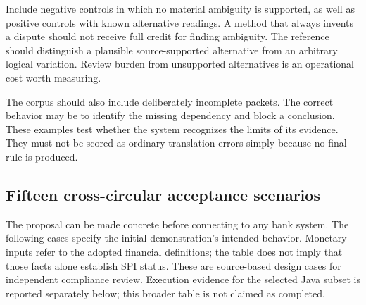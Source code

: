 \documentclass[12pt,a4paper,oneside,openany]{book}
\begin{document}
Include negative controls in which no material ambiguity is supported, as well
as positive controls with known alternative readings. A method that always
invents a dispute should not receive full credit for finding ambiguity. The
reference should distinguish a plausible source-supported alternative from an
arbitrary logical variation. Review burden from unsupported alternatives is an
operational cost worth measuring.

The corpus should also include deliberately incomplete packets. The correct
behavior may be to identify the missing dependency and block a conclusion. These
examples test whether the system recognizes the limits of its evidence. They
must not be scored as ordinary translation errors simply because no final rule
is produced.

\subsection{Fifteen cross-circular acceptance scenarios}
\label{merge:P-05-evidence:00}

\label{sec:evidence}

The proposal can be made concrete before connecting to any bank system. The
following cases specify the initial demonstration's intended behavior. Monetary
inputs refer to the adopted financial definitions; the table does not imply that
those facts alone establish SPI status. These are source-based design cases for
independent compliance review. Execution evidence for the selected Java subset
is reported separately below; this broader table is not claimed as completed.
\end{document}
